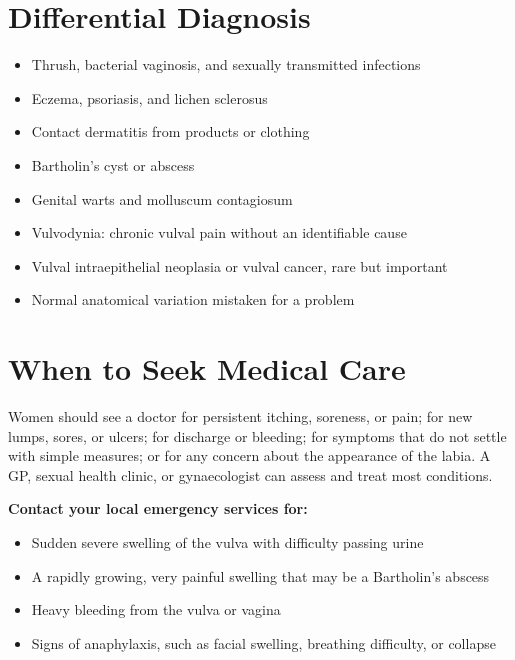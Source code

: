 \section*{Differential Diagnosis}
\begin{itemize}
    \item Thrush, bacterial vaginosis, and sexually transmitted infections
    \item Eczema, psoriasis, and lichen sclerosus
    \item Contact dermatitis from products or clothing
    \item Bartholin's cyst or abscess
    \item Genital warts and molluscum contagiosum
    \item Vulvodynia: chronic vulval pain without an identifiable cause
    \item Vulval intraepithelial neoplasia or vulval cancer, rare but important
    \item Normal anatomical variation mistaken for a problem
\end{itemize}

\section*{When to Seek Medical Care}
Women should see a doctor for persistent itching, soreness, or pain; for new lumps, sores, or ulcers; for discharge or bleeding; for symptoms that do not settle with simple measures; or for any concern about the appearance of the labia. A GP, sexual health clinic, or gynaecologist can assess and treat most conditions.

\textbf{Contact your local emergency services for:}
\begin{itemize}
    \item Sudden severe swelling of the vulva with difficulty passing urine
    \item A rapidly growing, very painful swelling that may be a Bartholin's abscess
    \item Heavy bleeding from the vulva or vagina
    \item Signs of anaphylaxis, such as facial swelling, breathing difficulty, or collapse
\end{itemize}

